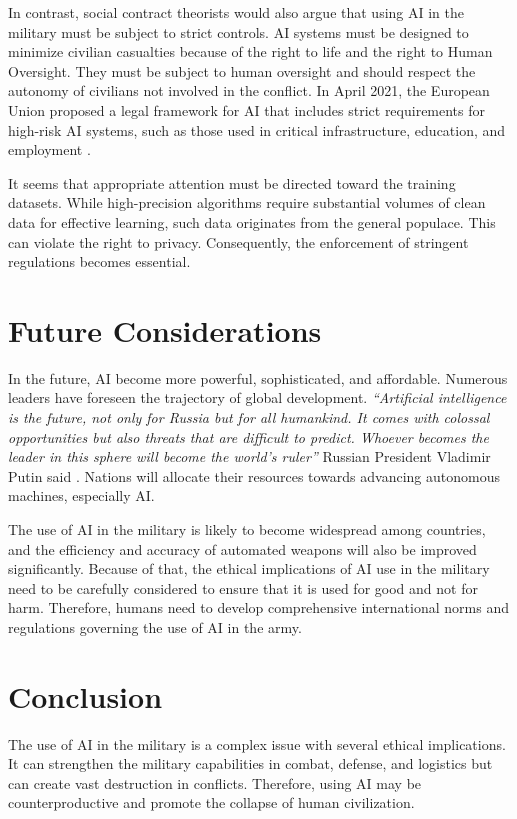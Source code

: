 \documentclass[12pt]{article}
\begin{document}
In contrast, social contract theorists would also argue that using AI in the military must be subject to strict controls. AI systems must be designed to minimize civilian casualties because of the right to life and the right to Human Oversight. They must be subject to human oversight and should respect the autonomy of civilians not involved in the conflict. In April 2021, the European Union proposed a legal framework for AI that includes strict requirements for high-risk AI systems, such as those used in critical infrastructure, education, and employment \cite{unknown-author-2023}.

It seems that appropriate attention must be directed toward the training datasets. While high-precision algorithms require substantial volumes of clean data for effective learning, such data originates from the general populace. This can violate the right to privacy. Consequently, the enforcement of stringent regulations becomes essential.


\section{Future Considerations}
In the future, AI become more powerful, sophisticated, and affordable.
Numerous leaders have foreseen the trajectory of global development. \textit{“Artificial intelligence is the future, not only for Russia but for all humankind. It comes with colossal opportunities but also threats that are difficult to predict. Whoever becomes the leader in this sphere will become the world's ruler”} Russian President Vladimir Putin said \cite{rt-2017}. Nations will allocate their resources towards advancing autonomous machines, especially AI. 

The use of AI in the military is likely to become widespread among countries, and the efficiency and accuracy of automated weapons will also be improved significantly. Because of that, the ethical implications of AI use in the military need to be carefully considered to ensure that it is used for good and not for harm. Therefore, humans need to develop comprehensive international norms and regulations governing the use of AI in the army.

\section{Conclusion}
The use of AI in the military is a complex issue with several ethical implications. It can strengthen the military capabilities in combat, defense, and logistics but can create vast destruction in conflicts. Therefore, using AI may be counterproductive and promote the collapse of human civilization.
\end{document}
